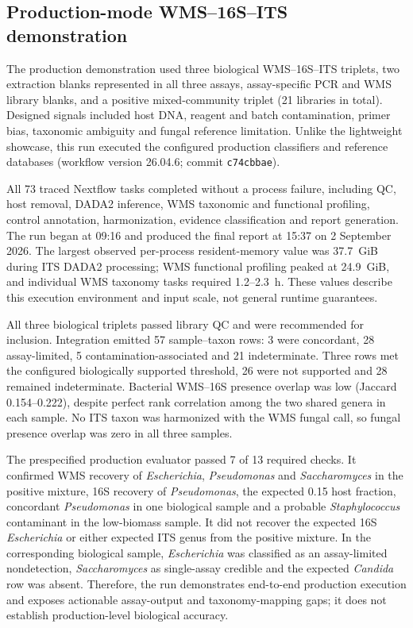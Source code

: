 \documentclass[9pt,twocolumn]{extarticle}
\newcommand{\software}[1]{\texttt{#1}}
\begin{document}
\subsection{Production-mode WMS--16S--ITS demonstration}

The production demonstration used three biological WMS--16S--ITS triplets,
two extraction blanks represented in all three assays, assay-specific PCR and
WMS library blanks, and a positive mixed-community triplet (21 libraries in
total). Designed signals included host DNA, reagent and batch contamination,
primer bias, taxonomic ambiguity and fungal reference limitation. Unlike the
lightweight showcase, this run executed the configured production classifiers
and reference databases (workflow version 26.04.6; commit
\software{c74cbbae}).

All 73 traced Nextflow tasks completed without a process failure, including QC,
host removal, DADA2 inference, WMS taxonomic and functional profiling,
control annotation, harmonization, evidence classification and report
generation. The run began at 09:16 and produced the final report at 15:37 on
2 September 2026. The largest observed per-process resident-memory value was
37.7~GiB during ITS DADA2 processing; WMS functional profiling peaked at
24.9~GiB, and individual WMS taxonomy tasks required 1.2--2.3~h. These values
describe this execution environment and input scale, not general runtime
guarantees.

All three biological triplets passed library QC and were recommended for
inclusion. Integration emitted 57 sample--taxon rows: 3 were concordant, 28
assay-limited, 5 contamination-associated and 21 indeterminate. Three rows met
the configured biologically supported threshold, 26 were not supported and 28
remained indeterminate. Bacterial WMS--16S presence overlap was low
(Jaccard 0.154--0.222), despite perfect rank correlation among the two shared
genera in each sample. No ITS taxon was harmonized with the WMS fungal call,
so fungal presence overlap was zero in all three samples.

The prespecified production evaluator passed 7 of 13 required checks. It
confirmed WMS recovery of \emph{Escherichia}, \emph{Pseudomonas} and
\emph{Saccharomyces} in the positive mixture, 16S recovery of
\emph{Pseudomonas}, the expected 0.15 host fraction, concordant
\emph{Pseudomonas} in one biological sample and a probable
\emph{Staphylococcus} contaminant in the low-biomass sample. It did not recover
the expected 16S \emph{Escherichia} or either expected ITS genus from the
positive mixture. In the corresponding biological sample,
\emph{Escherichia} was classified as an assay-limited nondetection,
\emph{Saccharomyces} as single-assay credible and the expected
\emph{Candida} row was absent. Therefore, the run demonstrates end-to-end
production execution and exposes actionable assay-output and taxonomy-mapping
gaps; it does not establish production-level biological accuracy.
\end{document}
